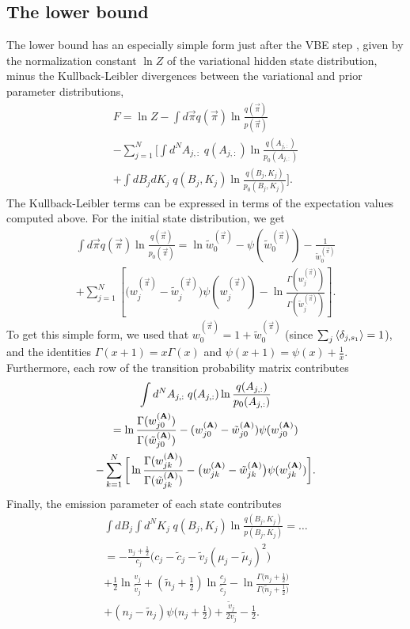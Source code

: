 \subsection{The lower bound}
The lower bound has an especially simple form just after the VBE step
\cite{mackay1997,beal2003,persson2013}, given by the normalization
constant $\ln Z$ of the variational hidden state distribution, minus
the Kullback-Leibler divergences between the variational and prior
parameter distributions,
\begin{multline}
  F=\ln Z
  -\int d\vec{\pi} q(\vec{\pi}) \ln\frac{q(\vec{\pi})}{p(\vec{\pi})}\\
  -\sum_{j=1}^N\Bigg[
  \int d^NA_{j,:}\;q(A_{j,:})\ln\frac{q(A_{j,:})}{p_0(A_{j,:})}\\
  +\int dB_jdK_j\;q(B_j,K_j)\ln\frac{q(B_j,K_j)}{p_0(B_j,K_j)}
  \Bigg].
\end{multline}
The Kullback-Leibler terms can be expressed in terms of the
expectation values computed above. For the initial state distribution,
we get
\begin{multline}
  \int d\vec{\pi} q(\vec{\pi}) \ln\frac{q(\vec{\pi})}{p_0(\vec{\pi})}
  =\ln\tilde w_0^{(\vec{\pi})}
    -\psi(\tilde w_0^{(\vec{\pi})})-\frac{1}{\tilde w_0^{(\vec{\pi})}}\\
    +\sum_{j=1}^N\left[
      \big(w_j^{(\vec{\pi})}-\tilde w_j^{(\vec{\pi})}\big)\psi(w_j^{(\vec{\pi})})
      -\ln\frac{\Gamma(w_j^{(\vec{\pi})})}{\Gamma(\tilde w_j^{(\vec{\pi})})}
      \right].
\end{multline}
To get this simple form, we used that $w_0^{(\vec{\pi})}=1+\tilde
w_0^{(\vec{\pi})}$ (since $\sum_j\left\langle \delta_{j,s_1}\right\rangle=1$), and the
identities $\Gamma(x+1)=x\Gamma(x)$ and $\psi(x+1)=\psi(x)+\frac 1x$.
Furthermore, each row of the transition probability matrix contributes
\begin{multline}
  \int d^NA_{j,:}\;q(A_{j,:})\ln\frac{q(A_{j,:})}{p_0(A_{j,:})}\\
  =\ln\frac{\Gamma(w_{j0}^{(\mathbf{A})})}{\Gamma(\tilde w_{j0}^{(\mathbf{A})})}
    -(w_{j0}^{(\mathbf{A})}-\tilde w_{j0}^{(\mathbf{A})})\psi(w_{j0}^{(\mathbf{A})})\\
    -\sum_{k=1}^N\bigg[
      \ln\frac{\Gamma(w_{jk}^{(\mathbf{A})})}{\Gamma(\tilde w_{jk}^{(\mathbf{A})})}
      -\big(w_{jk}^{(\mathbf{A})}-\tilde w_{jk}^{(\mathbf{A})}\big)
      \psi(w_{jk}^{(\mathbf{A})})\bigg].
\end{multline}
Finally, the emission parameter of each state contributes
\begin{multline}\label{seq:KBKL}
  \int dB_j\int d^NK_j\;q(B_j,K_j)
  \ln\frac{q(B_j,K_j)}{p(B_j,K_j)}=\ldots\\
  =-\frac{n_j+\frac 12}{c_j}
    \Big(c_j-\tilde c_j-\tilde v_j(\mu_j-\tilde \mu_j)^2\Big)\\
    +\frac 12\ln\frac{v_j}{\tilde v_j}
    +(\tilde n_j+\frac 12)\ln\frac{c_j}{\tilde c_j}
    -\ln\frac{\Gamma\big(n_j+\frac 12\big)}{\Gamma\big(\tilde n_j+\frac 12\big)}\\
    +(n_j-\tilde n_j)\psi\big(n_j+\frac 12\big)
    +\frac{\tilde v_j}{2v_j}
    -\frac 12.
\end{multline}

